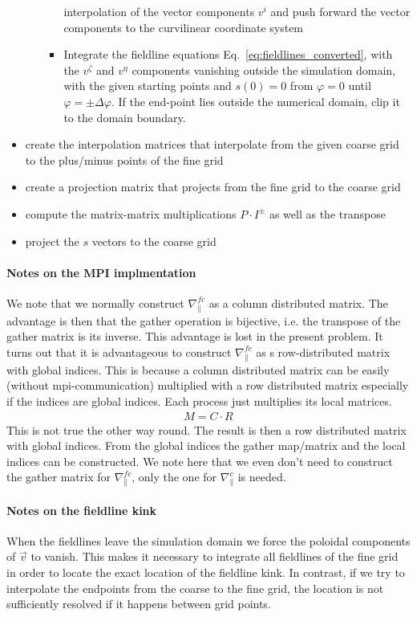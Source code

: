 \begin{itemize}
\begin{itemize}
\begin{itemize}
        interpolation of the vector components $v^i$ and push forward the vector components
        to the curvilinear coordinate system
      \item Integrate the fieldline equations Eq.~\eqref{eq:fieldlines_converted}, with the $v^\zeta$ and $v^\eta$ components vanishing
      outside the simulation domain,
    with the given starting points and $s(0)=0$ from $\varphi=0$ until $\varphi = \pm\Delta \varphi$.
    If the end-point lies outside the numerical domain, clip it to the domain boundary.
    \end{itemize}
  \end{itemize}
  \item create the interpolation matrices that interpolate from the given coarse grid
    to the plus/minus points of the fine grid
  \item create a projection matrix that projects from the fine grid to the coarse grid
  \item compute the matrix-matrix multiplications $P\cdot I^\pm$ as well as the transpose
  \item project the $s$ vectors to the coarse grid
\end{itemize}

\paragraph{Notes on the MPI implmentation}
We note that we normally construct $\nabla_\parallel^{fc}$ as a column 
distributed
matrix. The advantage is then that the gather operation is bijective, i.e. the transpose of the gather matrix is its inverse. 
This advantage is lost in the present problem. 
It turns out that it is advantageous to construct $\nabla_\parallel^{fc}$
as s row-distributed matrix with global indices. 
This is because a column distributed matrix can be easily (without mpi-communication) multiplied
with a row distributed matrix especially if the indices are global indices. 
Each process just multiplies its local matrices.
\begin{align}
M = C\cdot R
\end{align}
This is not true the other way round. 
The result is then a row distributed matrix with global indices. 
From the global indices the gather map/matrix and the local
indices can be constructed.
We note here that we even don't need to construct the gather matrix
for $\nabla_\parallel^{fc}$, only the one for $\nabla_\parallel^c$ is
needed.
\paragraph{Notes on the fieldline kink}
When the fieldlines leave the simulation domain we force the poloidal
components of $\vec v$ to vanish. This makes it necessary to integrate all
fieldlines of the fine grid in order to locate the exact location of
the fieldline kink. In contrast, if we try to interpolate the endpoints
from the coarse to the fine grid, the location is not sufficiently
resolved if it happens between grid points.

